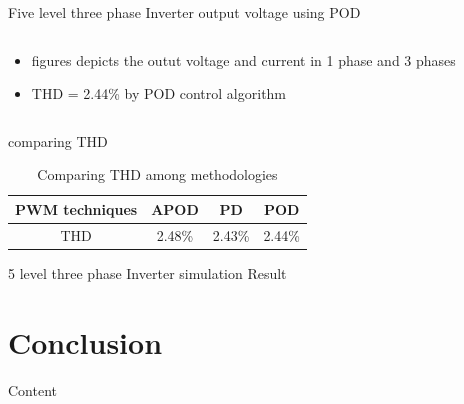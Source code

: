 \documentclass[
	11pt, %
]{beamer}
\begin{document}
\begin{frame}{Five level three phase Inverter output voltage using POD}
\begin{column}{0.5\textwidth}
\begin{figure}
		\end{figure}
		\begin{itemize}
			\scriptsize
			\item {figures depicts the outut voltage and current in 1 phase and 3 phases}
			\item {THD = 2.44\% by POD control algorithm}
		\end{itemize}
	\end{column}
\end{frame}

\begin{frame}{comparing THD}
	\begin{table}[htbp]
		\centering
		\caption{Comparing THD among methodologies}
		\label{tab:example}
		\begin{tabular}{|c|c|c|c|}
			\hline
			PWM techniques & APOD & PD & POD \\
			\hline
			THD & 2.48\% & 2.43\% & 2.44\% \\
			\hline
		\end{tabular}
	\end{table}
\end{frame}

\begin{frame}{5 level three phase Inverter simulation Result}
	
\end{frame}


\section{Conclusion}
\begin{frame}{Content}
	
\end{frame}










\end{document}
